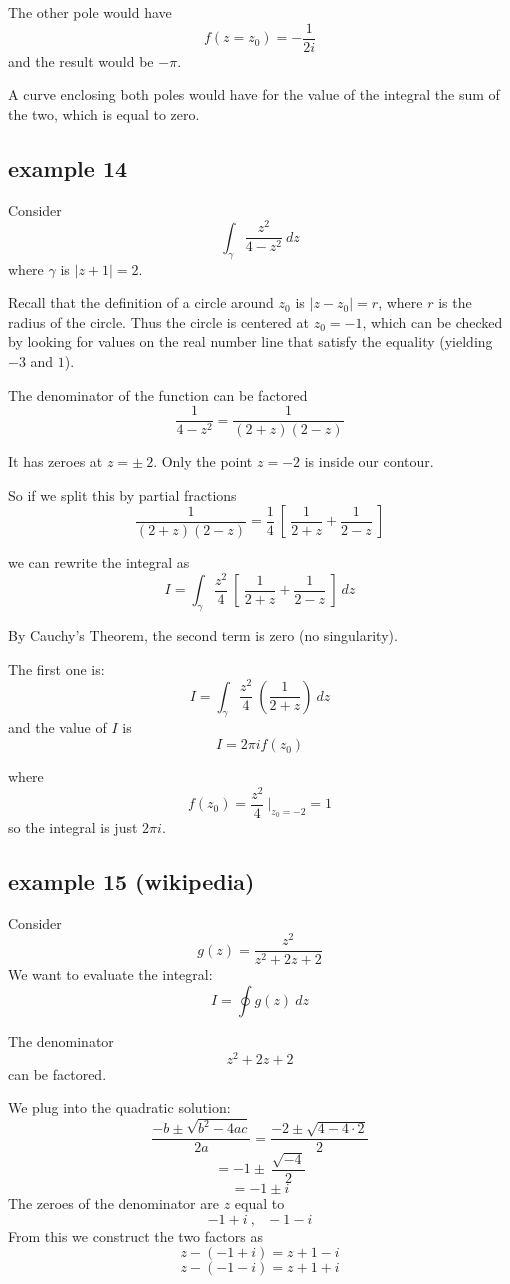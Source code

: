 \documentclass[11pt, oneside]{article}
\begin{document}
The other pole would have
\[ f(z = z_0) = -\frac{1}{2i} \]
and the result would be $- \pi$.  

A curve enclosing both poles would have for the value of the integral the sum of the two, which is equal to zero.

\subsection*{example 14}

\label{sec:ex14PF}

Consider
\[ \int_{\gamma} \frac{z^2}{4-z^2} \ dz \]
where $\gamma$ is $ | z + 1 | = 2$.

Recall that the definition of a circle around $z_0$ is $| z - z_0 | = r$, where $r$ is the radius of the circle.  Thus the circle is centered at $z_0 = -1$, which can be checked by looking for values on the real number line that satisfy the equality (yielding $-3$ and $1$).

The denominator of the function can be factored
\[ \frac{1}{4-z^2} = \frac{1}{(2+z)(2-z)} \]

It has zeroes at $z = \pm \ 2$.  Only the point $z = -2$ is inside our contour.

So if we split this by partial fractions
\[  \frac{1}{(2+z)(2-z)} = \frac{1}{4} \ [ \ \frac{1}{2+z} + \frac{1}{2-z} \ ] \]

we can rewrite the integral as
\[ I = \int_{\gamma} \frac{z^2}{4} \ [ \ \frac{1}{2+z} + \frac{1}{2-z} \ ] \ dz \]

By Cauchy's Theorem, the second term is zero (no singularity).

The first one is:
\[ I = \int_{\gamma} \frac{z^2}{4} \ ( \frac{1}{2+z} ) \ dz \]
and the value of $I$ is
\[ I = 2 \pi i f(z_0) \]

where 
\[ f(z_0) = \frac{z^2}{4}  \ \bigg |_{z_0 = -2} = 1 \]
so the integral is just $2 \pi i$.

\subsection*{example 15 (wikipedia)}

\label{sec:ex15PF}

Consider
\[ g(z) = \frac{z^2}{z^2 + 2z + 2} \]
We want to evaluate the integral:
\[ I = \oint g(z) \ dz \]

The denominator
\[ z^2 + 2z + 2 \]
can be factored.

We plug into the quadratic solution:
\[ \frac{-b \pm \sqrt{b^2 - 4ac}}{2a} =  \frac{-2 \pm \sqrt{4 - 4 \cdot 2}}{2} \]
\[ = -1 \pm \  \frac{\sqrt{-4}}{2} \]
\[ = -1 \pm i \]
The zeroes of the denominator are $z$ equal to 
\[ - 1 + i \ , \ \ \ - 1 - i \]
From this we construct the two factors as
\[ z - (- 1 + i) = z + 1 - i \]
\[ z - (-1 - i) = z + 1 + i \]
\end{document}
